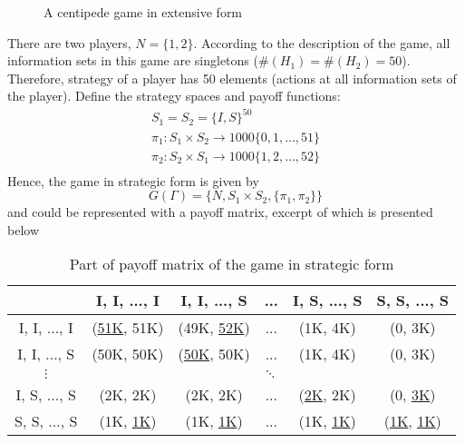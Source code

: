 \documentclass[]{article}
\begin{document}
\begin{figure}[h]
\begin{center}
	\end{center}
	\caption{A centipede game in extensive form}
	\label{fig:ex1ext}
\end{figure}

There are two players, $N = \{1, 2\}$. According to the description of the game, all information sets in this game are singletons ($\#(H_1) = \#(H_2) = 50$). Therefore, strategy of a player has 50 elements (actions at all information sets of the player). Define the strategy spaces and payoff functions:
\begin{equation}
	\begin{split}
		S_1 = S_2 = \{I, S\}^{50} \\ \nonumber
		\pi_1: S_1\times S_2 \to 1000\{0, 1, ..., 51\} \\
		\pi_2: S_2\times S_1 \to 1000\{1, 2, ..., 52\} \\
	\end{split}
\end{equation}
Hence, the game in strategic form is given by
\begin{equation}
	G(\Gamma) = \{N, S_1\times S_2, \{\pi_1, \pi_2\}\} \nonumber
\end{equation}
and could be represented with a payoff matrix, excerpt of which is presented below
\begin{table}[h]
	\centering
	\begin{tabular}{c|ccccc}
		& I, I, ..., I & I, I, ..., S & ... & I, S, ..., S & S, S, ..., S \\
		\hline
		I, I, ..., I & (\underline{51K}, 51K)   & (49K, \underline{52K})   & ... & (1K, 4K)     & (0, 3K)      \\
		I, I, ..., S & (50K, 50K)   & (\underline{50K}, 50K)   & ... & (1K, 4K)     & (0, 3K)      \\
		$\vdots$       & \multicolumn{5}{c}{$\ddots$}                                      \\
		I, S, ..., S & (2K, 2K)     & (2K, 2K)     & ... & (\underline{2K}, 2K)     & (0, \underline{3K})      \\
		S, S, ..., S & (1K, \underline{1K})     & (1K, \underline{1K})     & ... & (1K, \underline{1K})     & (\underline{1K}, \underline{1K})
	\end{tabular}
	\caption{Part of payoff matrix of the game in strategic form}
	\label{tab:ex1str}
\end{table}
\end{document}
